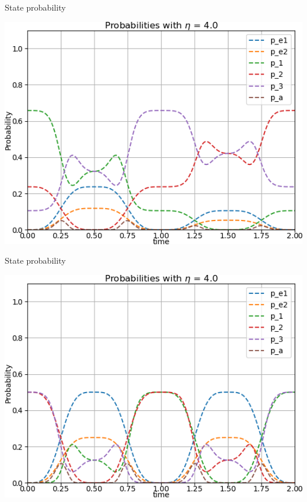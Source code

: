 \documentclass[t]{beamer}
\begin{document}
\begin{frame}{State probability}
\begin{center}
\includegraphics[scale=0.7]{pop_plot_X532.png}
\end{center}
\end{frame}

\begin{frame}{State probability}
\begin{center}
\includegraphics[scale=0.7]{pop_plot_X011.png}
\end{center}
\end{frame}
\end{document}
